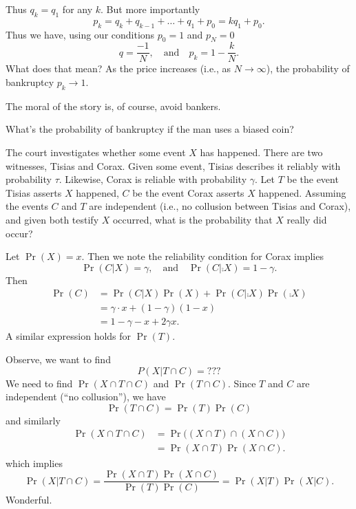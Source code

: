 Thus $q_{k}=q_{1}$ for any $k$. But more importantly
\begin{equation}
p_{k}=q_{k}+q_{k-1}+\dots+q_{1}+p_{0}=kq_{1}+p_{0}.
\end{equation}
Thus we have, using our conditions $p_0=1$ and $p_N=0$
\begin{equation}
q=\frac{-1}{N},\quad\mbox{and}\quad
p_{k}=1-\frac{k}{N}.
\end{equation}
What does that mean? As the price increases (i.e., as $N\to\infty$), the
probability of bankruptcy $p_{k}\to1$.

The moral of the story is, of course, avoid bankers.

 What's the probability of bankruptcy if the man uses a
biased coin? 


The court investigates whether some event $X$ has happened. There are
two witnesses, Tisias and Corax. Given some event, Tisias describes it
reliably with probability $\tau$. Likewise, Corax is reliable with
probability $\gamma$. Let $T$ be the event Tisias asserts $X$ happened,
$C$ be the event Corax asserts $X$ happened. Assuming the events $C$ and
$T$ are independent (i.e., no collusion between Tisias and Corax), and
given both testify $X$ occurred, what is the probability that $X$ really
did occur?

Let $\Pr(X)=x$. Then we note the reliability condition for Corax implies
\begin{equation}
\Pr(C|X)=\gamma,\quad\mbox{and}\quad\Pr(C|\comp{X})=1-\gamma.
\end{equation}
Then
\begin{subequations}
\begin{align}
\Pr(C) &=\Pr(C|X)\Pr(X)+\Pr(C|\comp{X})\Pr(\comp{X})\\
&= \gamma\cdot x+(1-\gamma)(1-x)\\
&= 1 -\gamma-x+2\gamma x.
\end{align}
\end{subequations}
A similar expression holds for $\Pr(T)$.

Observe, we want to find
\begin{equation}
P(X|T\cap C)=???
\end{equation}
We need to find $\Pr(X\cap T\cap C)$ and $\Pr(T\cap C)$. Since $T$ and
$C$ are independent (``no collusion''), we have
\begin{equation}
\Pr(T\cap C)=\Pr(T)\Pr(C)
\end{equation}
and similarly
\begin{equation}
\begin{split}
\Pr(X\cap T\cap C)&=\Pr\bigl((X\cap T)\cap(X\cap C)\bigr)\\
&=\Pr(X\cap T)\Pr(X\cap C).
\end{split}
\end{equation}
which implies
\begin{equation}
\Pr(X|T\cap C)=\frac{\Pr(X\cap T)\Pr(X\cap
C)}{\Pr(T)\Pr(C)}=\Pr(X|T)\Pr(X|C).
\end{equation}
Wonderful.

